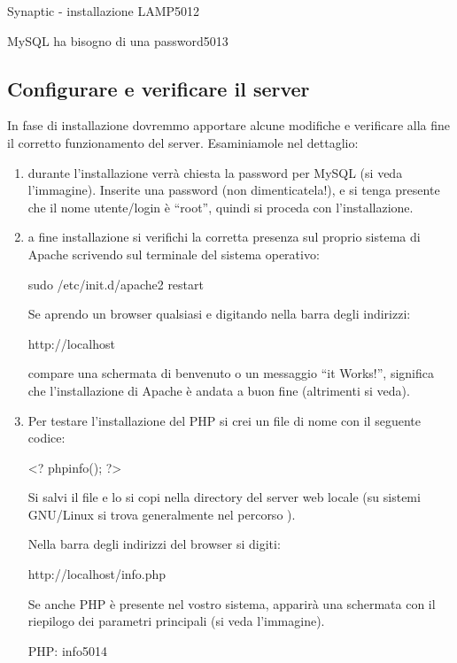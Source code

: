 \begin{img}{Synaptic - installazione LAMP}{5}{012}
\end{img}

\begin{img}{MySQL ha bisogno di una password}{5}{013}
\end{img}

\subsection{Configurare e verificare il server}
In fase di installazione dovremmo apportare alcune modifiche e verificare alla fine il corretto funzionamento del server. Esaminiamole nel dettaglio:

\begin{enumerate}
\item durante l'installazione verrà chiesta la password per MySQL (si veda l'immagine). Inserite una password (non dimenticatela!), e si tenga presente che il nome utente/login è ``root'', quindi si proceda con l'installazione.
\item a fine installazione si verifichi la corretta presenza sul proprio sistema di Apache scrivendo sul terminale del sistema operativo:

\begin{code}
sudo /etc/init.d/apache2 restart
\end{code}

Se aprendo un browser qualsiasi e digitando nella barra degli indirizzi:

\begin{code}
http://localhost
\end{code}

compare una schermata di benvenuto o un messaggio ``it Works!'', significa che l'installazione di Apache è andata a buon fine (altrimenti si veda).

\item Per testare l'installazione del \ac{PHP} si crei un file di nome  con il seguente codice:

\begin{code}
<?
	phpinfo();
?>
\end{code}

Si salvi il file e lo si copi nella directory del server web locale (su sistemi GNU/Linux si trova generalmente nel percorso ).

Nella barra degli indirizzi del browser si digiti:

\begin{code}
http://localhost/info.php
\end{code}

Se anche \ac{PHP} è presente nel vostro sistema, apparirà una schermata con il riepilogo dei parametri principali (si veda l'immagine).

\begin{img}{PHP: info}{5}{014}
\end{img}

\end{enumerate}

